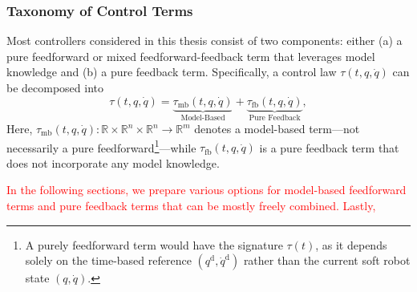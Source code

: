 \subsubsection{Taxonomy of Control Terms}
Most controllers considered in this thesis consist of two components: either (a) a pure feedforward or mixed feedforward-feedback term that leverages model knowledge and (b) a pure feedback term. Specifically, a control law $\tau(t, q, \dot{q})$ can be decomposed into
\begin{equation}
    \tau(t, q, \dot{q}) = \underbrace{\tau_\mathrm{mb}(t, q, \dot{q})}_\text{Model-Based} + \underbrace{\tau_\mathrm{fb}(t, q, \dot{q})}_\text{Pure Feedback},
\end{equation}
Here, $\tau_\mathrm{mb}(t, q, \dot{q}): \mathbb{R} \times \mathbb{R}^n \times \mathbb{R}^n \to \mathbb{R}^m$ denotes a model-based term—not necessarily a pure feedforward\footnote{A purely feedforward term would have the signature $\tau(t)$, as it depends solely on the time-based reference $(q^\mathrm{d},\dot{q}^\mathrm{d})$ rather than the current soft robot state $(q,\dot{q})$.}—while $\tau_\mathrm{fb}(t, q, \dot{q})$ is a pure feedback term that does not incorporate any model knowledge.

\textcolor{red}{In the following sections, we prepare various options for model-based feedforward terms and pure feedback terms that can be mostly freely combined. Lastly, }

